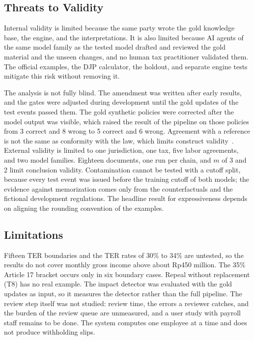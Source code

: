 \subsection{Threats to Validity}
Internal validity is limited because the same party wrote the gold knowledge base, the engine, and the interpretations. It is also limited because AI agents of the same model family as the tested model drafted and reviewed the gold material and the unseen changes, and no human tax practitioner validated them. The official examples, the DJP calculator, the holdout, and separate engine tests mitigate this risk without removing it.

The analysis is not fully blind. The amendment was written after early results, and the gates were adjusted during development until the gold updates of the test events passed them. The gold synthetic policies were corrected after the model output was visible, which raised the result of the pipeline on those policies from 3 correct and 8 wrong to 5 correct and 6 wrong. Agreement with a reference is not the same as conformity with the law, which limits construct validity~\cite{witt2024encoding}. External validity is limited to one jurisdiction, one tax, five labor agreements, and two model families. Eighteen documents, one run per chain, and $m$ of 3 and 2 limit conclusion validity. Contamination cannot be tested with a cutoff split, because every test event was issued before the training cutoff of both models; the evidence against memorization comes only from the counterfactuals and the fictional development regulations. The headline result for expressiveness depends on aligning the rounding convention of the examples.

\subsection{Limitations}
Fifteen TER boundaries and the TER rates of 30\% to 34\% are untested, so the results do not cover monthly gross income above about Rp450 million. The 35\% Article 17 bracket occurs only in six boundary cases. Repeal without replacement (T8) has no real example. The impact detector was evaluated with the gold updates as input, so it measures the detector rather than the full pipeline. The review step itself was not studied: review time, the errors a reviewer catches, and the burden of the review queue are unmeasured, and a user study with payroll staff remains to be done. The system computes one employee at a time and does not produce withholding slips.
